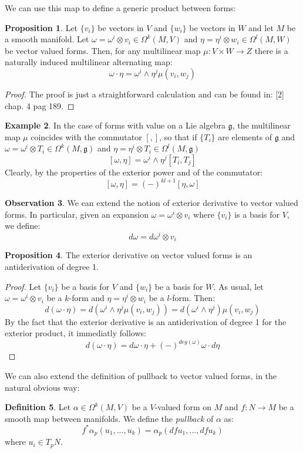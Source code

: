 \documentclass[12pt,a4paper]{report}
\theoremstyle{definition}
\newtheorem{Def}{Definition}[chapter]
\theoremstyle{Theorem}
\newtheorem{Prop}[Def]{Proposition}
\theoremstyle{definition}
\newtheorem{Ex}[Def]{Example}
\theoremstyle{definition}
\newtheorem{Obs}[Def]{Observation}
\begin{document}
	We can use this map to define a generic product between forms:
	\begin{Prop}
		Let $\{v_i\}$ be vectors in $V$ and $\{w_i\}$ be vectors in $W$ and let $M$ be a smooth manifold. Let $\omega=\omega^i\otimes v_i\in\Omega^k(M,V)$ and $\eta=\eta^i\otimes w_i\in\Omega^l(M,W)$ be vector valued forms. Then, for any multilinear map $\mu:V\times W\rightarrow Z$ there is a naturally induced multilinear alternating map:
		$$\omega\cdot \eta=\omega^i\wedge\eta^j \mu(v_i,w_j)$$
	\end{Prop}
	\begin{proof}
		The proof is just a straightforward calculation and can be found in: [2] chap. 4 pag 189.
	\end{proof}
	\begin{Ex}\label{Ex_3.5.1}
		In the case of forms with value on a Lie algebra $\mathfrak{g}$, the multilinear map $\mu$ coincides with the commutator $[,]$, so that if $\{T_i\}$ are elements of $\mathfrak{g}$ and $\omega=\omega^i\otimes T_i\in\Omega^k(M,\mathfrak{g})$ and $\eta=\eta^i\otimes T_i\in\Omega^l(M,\mathfrak{g})$
		$$[\omega,\eta]=\omega^i\wedge\eta^j[T_i,T_j]$$
		Clearly, by the properties of the exterior power and of the commutator:
		$$[\omega,\eta]=(-)^{kl+1}[\eta,\omega]$$
	\end{Ex}
	\begin{Obs}
		We can extend the notion of exterior derivative to vector valued forms. In particular, given an expansion $\omega=\omega^i\otimes v_i$ where $\{v_i\}$ is a basis for $V$, we define:
		$$d\omega=d\omega^i\otimes v_i$$
	\end{Obs}
	\begin{Prop}
		The exterior derivative on vector valued forms is an antiderivation of degree 1.
	\end{Prop}
	\begin{proof}
		Let $\{v_i\}$ be a basis for $V$ and $\{w_i\}$ be a basis for $W$. As usual, let $\omega=\omega^i\otimes v_i$ be a $k$-form and $\eta=\eta^i\otimes w_i$ be a $l$-form. Then:
		$$d(\omega\cdot \eta)=d(\omega^i\wedge\eta^j\mu(v_i,w_j))=d(\omega^i\wedge\eta^j)\mu(v_i,w_j)$$
		By the fact that the exterior derivative is an antiderivation of degree 1 for the exterior product, it immediatly follows:
		$$d(\omega\cdot \eta)=d\omega\cdot \eta+(-)^{deg(\omega)}\omega\cdot d\eta$$
	\end{proof}
	We can also extend the definition of pullback to vector valued forms, in the natural obvious way:
	\begin{Def}
		Let $\alpha\in\Omega^k(M,V)$ be a $V$-valued form on $M$ and $f:N\rightarrow M$ be a smooth map between manifolds. We define the \textit{pullback} of $\alpha$ as:
		$$f^*\alpha_p(u_1,...,u_k)=\alpha_p(dfu_1,...,dfu_k)$$
		where $u_i\in T_pN$.
	\end{Def}
\end{document}
